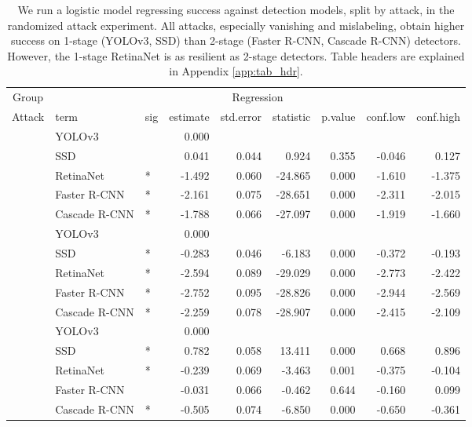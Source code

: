 \begin{longtable}[t]{lllrrrrrr}
\caption{\label{tab:model_stage_table}We run a logistic model regressing success against detection models, split by attack, in the randomized attack experiment. All attacks, especially vanishing and mislabeling, obtain higher success on 1-stage (YOLOv3, SSD) than 2-stage (Faster R-CNN, Cascade R-CNN) detectors. However, the 1-stage RetinaNet is as resilient as 2-stage detectors. Table headers are explained in Appendix \ref{app:tab_hdr}.}\\
\toprule
\multicolumn{1}{c}{Group} & \multicolumn{8}{c}{Regression} \\
\cmidrule(l{3pt}r{3pt}){1-1} \cmidrule(l{3pt}r{3pt}){2-9}
Attack & term & sig & estimate & std.error & statistic & p.value & conf.low & conf.high\\
\midrule
 & YOLOv3 &  & 0.000 &  &  &  &  & \\
\cmidrule{2-9}\nopagebreak
 & SSD &  & 0.041 & 0.044 & 0.924 & 0.355 & -0.046 & 0.127\\
\cmidrule{2-9}\nopagebreak
 & RetinaNet & * & -1.492 & 0.060 & -24.865 & 0.000 & -1.610 & -1.375\\
\cmidrule{2-9}\nopagebreak
 & Faster R-CNN & * & -2.161 & 0.075 & -28.651 & 0.000 & -2.311 & -2.015\\
\cmidrule{2-9}\nopagebreak
\multirow{-5}{*}{\raggedright\arraybackslash Vanishing} & Cascade R-CNN & * & -1.788 & 0.066 & -27.097 & 0.000 & -1.919 & -1.660\\
\cmidrule{1-9}\pagebreak[0]
 & YOLOv3 &  & 0.000 &  &  &  &  & \\
\cmidrule{2-9}\nopagebreak
 & SSD & * & -0.283 & 0.046 & -6.183 & 0.000 & -0.372 & -0.193\\
\cmidrule{2-9}\nopagebreak
 & RetinaNet & * & -2.594 & 0.089 & -29.029 & 0.000 & -2.773 & -2.422\\
\cmidrule{2-9}\nopagebreak
 & Faster R-CNN & * & -2.752 & 0.095 & -28.826 & 0.000 & -2.944 & -2.569\\
\cmidrule{2-9}\nopagebreak
\multirow{-5}{*}{\raggedright\arraybackslash Mislabeling} & Cascade R-CNN & * & -2.259 & 0.078 & -28.907 & 0.000 & -2.415 & -2.109\\
\cmidrule{1-9}\pagebreak[0]
 & YOLOv3 &  & 0.000 &  &  &  &  & \\
\cmidrule{2-9}\nopagebreak
 & SSD & * & 0.782 & 0.058 & 13.411 & 0.000 & 0.668 & 0.896\\
\cmidrule{2-9}\nopagebreak
 & RetinaNet & * & -0.239 & 0.069 & -3.463 & 0.001 & -0.375 & -0.104\\
\cmidrule{2-9}\nopagebreak
 & Faster R-CNN &  & -0.031 & 0.066 & -0.462 & 0.644 & -0.160 & 0.099\\
\cmidrule{2-9}\nopagebreak
\multirow{-5}{*}{\raggedright\arraybackslash Untargeted} & Cascade R-CNN & * & -0.505 & 0.074 & -6.850 & 0.000 & -0.650 & -0.361\\
\bottomrule
\end{longtable}
\endgroup{}

